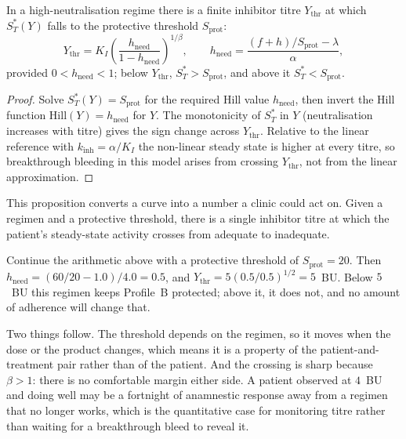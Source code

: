 \begin{proposition}
\label{prop:C_threshold}
In a high-neutralisation regime there is a finite inhibitor titre $Y_{\text{thr}}$
at which $S_T^\ast(Y)$ falls to the protective threshold $S_{\text{prot}}$:
\[
Y_{\text{thr}}=K_I\left(\frac{h_{\text{need}}}{1-h_{\text{need}}}\right)^{1/\beta},
\qquad h_{\text{need}}=\frac{(f+h)/S_{\text{prot}}-\lambda}{\alpha},
\]
provided $0<h_{\text{need}}<1$; below $Y_{\text{thr}}$, $S_T^\ast>S_{\text{prot}}$,
and above it $S_T^\ast<S_{\text{prot}}$.
\end{proposition}
\begin{proof}
Solve $S_T^\ast(Y)=S_{\text{prot}}$ for the required Hill value $h_{\text{need}}$,
then invert the Hill function \citep{hill_1910} $\mathrm{Hill}(Y)=h_{\text{need}}$ for $Y$. The
monotonicity of $S_T^\ast$ in $Y$ (neutralisation increases with titre) gives the
sign change across $Y_{\text{thr}}$. Relative to the linear reference with
$k_{\text{inh}}=\alpha/K_I$ the non-linear steady state is higher at every
titre, so breakthrough bleeding in this model arises from crossing
$Y_{\text{thr}}$, not from the linear approximation.
\end{proof}

\begin{reading}
This proposition converts a curve into a number a clinic could act on. Given a
regimen and a protective threshold, there is a single inhibitor titre at which
the patient's steady-state activity crosses from adequate to inadequate.

Continue the arithmetic above with a protective threshold of
$S_{\text{prot}}=20$. Then $h_{\text{need}}=(60/20-1.0)/4.0=0.5$, and
$Y_{\text{thr}}=5\left(0.5/0.5\right)^{1/2}=5$~BU. Below $5$~BU this regimen
keeps Profile~B protected; above it, it does not, and no amount of adherence will
change that.

Two things follow. The threshold depends on the regimen, so it moves when the
dose or the product changes, which means it is a property of the
patient-and-treatment pair rather than of the patient. And the crossing is
sharp because $\beta>1$: there is no comfortable margin either side. A patient
observed at $4$~BU and doing well may be a fortnight of anamnestic response away
from a regimen that no longer works, which is the quantitative case for
monitoring titre rather than waiting for a breakthrough bleed to reveal it.
\end{reading}

